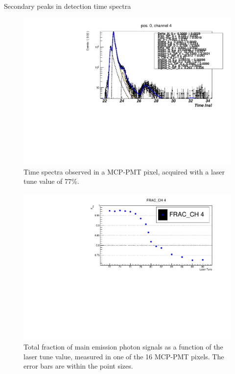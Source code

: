 \documentclass[a4paper,11pt]{article}
\begin{document}
\begin{subsection}{Secondary peaks in detection time spectra}
\begin{figure}
\begin{center}
\includegraphics[scale=0.5]{plots/ch4_T77}
\caption{Time spectra observed in a MCP-PMT pixel, acquired with a laser tune value of 77\%.}
\label{fig:SP_MCPPMT_T77}
\end{center}
\end{figure}


\begin{figure}
\begin{center}
\includegraphics[scale=0.7]{plots/Fsig_ch4}
\caption{Total fraction of main emission photon signals as a function of the laser tune value, measured in one of the 16 MCP-PMT pixels. The error bars are within the point sizes. }
\label{fig:SP_MCPPMT}
\end{center}
\end{figure}
\end{subsection}
\end{document}
